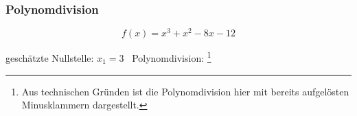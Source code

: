 \subsubsection{Polynomdivision}

\[
    f(x) = x^3 + x^2 -8x - 12   
\]

geschätzte Nullstelle: \(x_1 = 3\) \textrightarrow\ Polynomdivision:
\footnote{Aus technischen Gründen ist die Polynomdivision hier mit bereits aufgelösten Minusklammern dargestellt.}

